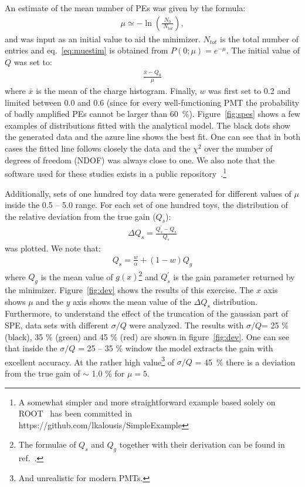 \documentclass[preprint,12pt]{elsarticle}
\begin{document}
An estimate of the mean number of PEs was given by the formula: 
\begin{align}
\mu \simeq - \ln \left(  \frac{N_0}{\ N_{tot}} \right),  
\label{eq:muestim}
\end{align}
and was input as an initial value to aid the minimizer. 
$N_{tot}$ is the total number of entries and eq.~\eqref{eq:muestim} is obtained from $P(0; \mu ) = e^{-\mu}$. 
The initial value of $Q$ was set to: 
\begin{align}
\frac{ \bar x - Q_0 }{\mu}
\label{eq:laestim}
\end{align}
where $\bar x$ is the mean of the charge histogram. 
Finally, $w$ was first set to 0.2 and limited between 0.0 and 0.6 (since for every well-functioning PMT the probability of badly amplified PEs cannot be larger than 60~\%).
Figure~\ref{fig:spes} shows a few examples of distributions fitted with the analytical model. 
The black dots show the generated data and the azure line shows the best fit. 
One can see that in both cases the fitted line follows closely the data and the $\chi^2$ over the number of degrees of freedom (NDOF) was always close to one. 
We also note that the software used for these studies exists in a public repository~\cite{git}.\footnote{%
A somewhat simpler and more straightforward example based solely on ROOT~\cite{root} has been committed in https://github.com/lkalousis/SimpleExample}

Additionally, sets of one hundred toy data were generated for different values of $\mu$ inside the 0.5 -- 5.0 range. 
For each set of one hundred toys, the distribution of the relative deviation from the true gain ($Q_s$):
\begin{align}
\Delta Q_s = \frac{ Q_s^\prime - Q_s }{ Q_s }
\label{eq:laestim}
\end{align}
was plotted. We note that:
\begin{align}
 Q_s = \frac{w}{\alpha} + (1-w)Q_g
\label{eq:laestim}
\end{align}
where $Q_g$ is the mean value of $g(x)$\footnote{The formulae of $Q_s$ and $Q_g$ together with their derivation can be found in ref.~\cite{me2}. } and $Q_s^\prime$ is the gain parameter returned by the minimizer.
Figure~\ref{fig:dev} shows the results of this exercise. 
The $x$ axis shows $\mu$ and the $y$ axis shows the mean value of the $\Delta Q_s$ distribution. 
Furthermore, to understand the effect of the truncation of the gaussian part of SPE,  data sets with different $\sigma/Q$ were analyzed. 
The results with $\sigma/Q$= 25 \% (black), 35 \% (green) and 45 \% (red) are shown in figure~\ref{fig:dev}. 
One can see that inside the $\sigma/Q$ = 25 -- 35 \% window the model extracts the gain with excellent accuracy. 
At the rather high value\footnote{And unrealistic for modern PMTs.} of $\sigma/Q$ = 45~\% there is a deviation from the true gain of $\sim$ 1.0 \% for $\mu = 5$.
\end{document}
